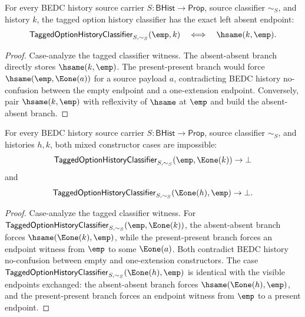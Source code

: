 \begin{theorem}
\label{thm:tagged-option-history-classifier-left-absent-exactness}
For every BEDC history source carrier $S:\mathsf{BHist}\to\mathsf{Prop}$,
source classifier $\sim_S$, and history $k$, the tagged option history
classifier has the exact left absent endpoint:
$$
\mathsf{TaggedOptionHistoryClassifier}_{S,\sim_S}(\emp,k)
\quad\Longleftrightarrow\quad
\hsame(k,\emp).
$$
\end{theorem}
\begin{proof}
Case-analyze the tagged classifier witness. The absent-absent branch directly
stores $\hsame(k,\emp)$. The present-present branch would force
$\hsame(\emp,\Eone(a))$ for a source payload $a$, contradicting BEDC
history no-confusion between the empty endpoint and a one-extension endpoint.
Conversely, pair $\hsame(k,\emp)$ with reflexivity of $\hsame$ at $\emp$ and
build the absent-absent branch.
\end{proof}

\begin{theorem}
\label{thm:tagged-option-history-mixed-tag-separation}
For every BEDC history source carrier $S:\mathsf{BHist}\to\mathsf{Prop}$,
source classifier $\sim_S$, and histories $h,k$, both mixed constructor cases
are impossible:
$$
\mathsf{TaggedOptionHistoryClassifier}_{S,\sim_S}(\emp,\Eone(k))\to\bot
$$
and
$$
\mathsf{TaggedOptionHistoryClassifier}_{S,\sim_S}(\Eone(h),\emp)\to\bot.
$$
\end{theorem}
\begin{proof}
Case-analyze the tagged classifier witness. For
$\mathsf{TaggedOptionHistoryClassifier}_{S,\sim_S}(\emp,\Eone(k))$, the
absent-absent branch forces $\hsame(\Eone(k),\emp)$, while the present-present
branch forces an endpoint witness from $\emp$ to some $\Eone(a)$. Both
contradict BEDC history no-confusion between empty and one-extension
constructors. The case
$\mathsf{TaggedOptionHistoryClassifier}_{S,\sim_S}(\Eone(h),\emp)$ is
identical with the visible endpoints exchanged: the absent-absent branch forces
$\hsame(\Eone(h),\emp)$, and the present-present branch forces an endpoint
witness from $\emp$ to a present endpoint.
\end{proof}


